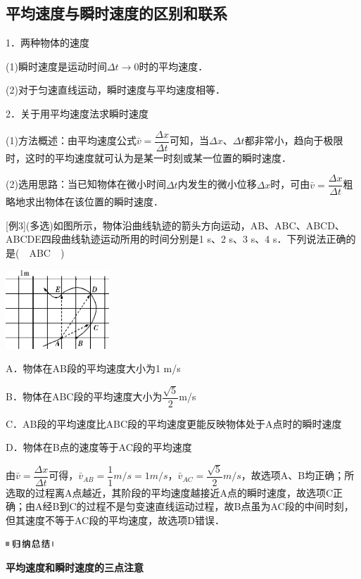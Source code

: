 \documentclass[cn,10.5pt,chinese,mac,chinesefont=founder]{elegantbook}
\begin{document}
\newpage
\subsection{平均速度与瞬时速度的区别和联系}

1．两种物体的速度

(1)瞬时速度是运动时间$\Delta t\rightarrow 0$时的平均速度．

(2)对于匀速直线运动，瞬时速度与平均速度相等．

2．关于用平均速度法求瞬时速度

(1)方法概述：由平均速度公式$\bar v=\dfrac{\Delta x}{\Delta t}$可知，当$\Delta x$、$\Delta t$都非常小，趋向于极限时，这时的平均速度就可认为是某一时刻或某一位置的瞬时速度．

(2)选用思路：当已知物体在微小时间$\Delta t$内发生的微小位移$\Delta x$时，可由$\bar v=\dfrac{\Delta x}{\Delta t}$粗略地求出物体在该位置的瞬时速度．

{[}例3{]}(多选)如图所示，物体沿曲线轨迹的箭头方向运动，AB、ABC、ABCD、ABCDE四段曲线轨迹运动所用的时间分别是1
s、2 s、3 s、4 s．下列说法正确的是(　ABC　)

\begin{center}\includegraphics[width=1.53125in,height=1.16667in]{media/image14.png}\end{center}

A．物体在AB段的平均速度大小为1 m/s

B．物体在ABC段的平均速度大小为$\dfrac{\sqrt{5}}{2}$m/s

C．AB段的平均速度比ABC段的平均速度更能反映物体处于A点时的瞬时速度

D．物体在B点的速度等于AC段的平均速度

\begin{solution}
	由$\bar v=\dfrac{\Delta x}{\Delta t}$可得，$\bar v_{AB}=\dfrac{1}{1}m/s=1m/s$，$\bar v_{AC}=\dfrac{\sqrt{5}}{2}m/s$，故选项A、B均正确；所选取的过程离A点越近，其阶段的平均速度越接近A点的瞬时速度，故选项C正确；由A经B到C的过程不是匀变速直线运动过程，故B点虽为AC段的中间时刻，但其速度不等于AC段的平均速度，故选项D错误．
\end{solution}


\begin{center}\includegraphics[width=0.70833in,height=0.125in]{media/image13.png}

\textbf{平均速度和瞬时速度的三点注意}
\end{center}
\end{document}
